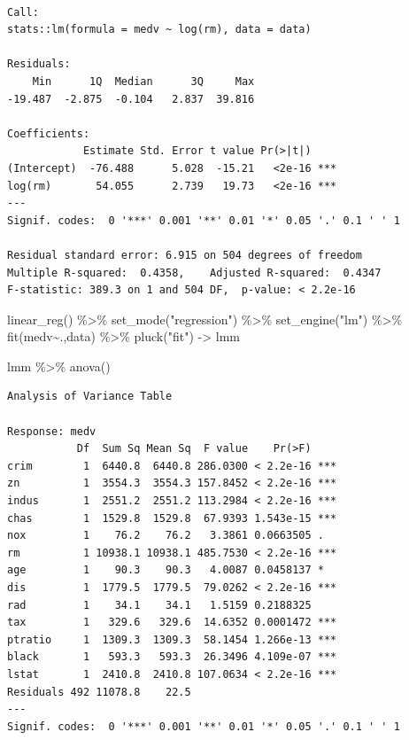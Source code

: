 \documentclass[
  letterpaper,
  DIV=11,
  numbers=noendperiod]{scrreprt}
\newenvironment{Shaded}{\begin{snugshade}}{\end{snugshade}}
\newcommand{\FunctionTok}[1]{\textcolor[rgb]{0.02,0.16,0.49}{#1}}
\newcommand{\NormalTok}[1]{\textcolor[rgb]{0.33,0.33,0.33}{#1}}
\newcommand{\OtherTok}[1]{\textcolor[rgb]{0.85,0.12,0.09}{#1}}
\newcommand{\SpecialCharTok}[1]{\textcolor[rgb]{0.00,0.46,0.62}{#1}}
\newcommand{\StringTok}[1]{\textcolor[rgb]{0.00,0.50,0.00}{#1}}
\begin{document}
\begin{verbatim}

Call:
stats::lm(formula = medv ~ log(rm), data = data)

Residuals:
    Min      1Q  Median      3Q     Max 
-19.487  -2.875  -0.104   2.837  39.816 

Coefficients:
            Estimate Std. Error t value Pr(>|t|)    
(Intercept)  -76.488      5.028  -15.21   <2e-16 ***
log(rm)       54.055      2.739   19.73   <2e-16 ***
---
Signif. codes:  0 '***' 0.001 '**' 0.01 '*' 0.05 '.' 0.1 ' ' 1

Residual standard error: 6.915 on 504 degrees of freedom
Multiple R-squared:  0.4358,    Adjusted R-squared:  0.4347 
F-statistic: 389.3 on 1 and 504 DF,  p-value: < 2.2e-16
\end{verbatim}

\begin{Shaded}
\begin{Highlighting}[]
\FunctionTok{linear\_reg}\NormalTok{() }\SpecialCharTok{\%\textgreater{}\%} 
  \FunctionTok{set\_mode}\NormalTok{(}\StringTok{"regression"}\NormalTok{) }\SpecialCharTok{\%\textgreater{}\%} 
  \FunctionTok{set\_engine}\NormalTok{(}\StringTok{"lm"}\NormalTok{) }\SpecialCharTok{\%\textgreater{}\%} 
  \FunctionTok{fit}\NormalTok{(medv}\SpecialCharTok{\textasciitilde{}}\NormalTok{.,data) }\SpecialCharTok{\%\textgreater{}\%} 
  \FunctionTok{pluck}\NormalTok{(}\StringTok{"fit"}\NormalTok{) }\OtherTok{{-}\textgreater{}}\NormalTok{ lmm}
\end{Highlighting}
\end{Shaded}

\begin{Shaded}
\begin{Highlighting}[]
\NormalTok{lmm }\SpecialCharTok{\%\textgreater{}\%} \FunctionTok{anova}\NormalTok{()}
\end{Highlighting}
\end{Shaded}

\begin{verbatim}
Analysis of Variance Table

Response: medv
           Df  Sum Sq Mean Sq  F value    Pr(>F)    
crim        1  6440.8  6440.8 286.0300 < 2.2e-16 ***
zn          1  3554.3  3554.3 157.8452 < 2.2e-16 ***
indus       1  2551.2  2551.2 113.2984 < 2.2e-16 ***
chas        1  1529.8  1529.8  67.9393 1.543e-15 ***
nox         1    76.2    76.2   3.3861 0.0663505 .  
rm          1 10938.1 10938.1 485.7530 < 2.2e-16 ***
age         1    90.3    90.3   4.0087 0.0458137 *  
dis         1  1779.5  1779.5  79.0262 < 2.2e-16 ***
rad         1    34.1    34.1   1.5159 0.2188325    
tax         1   329.6   329.6  14.6352 0.0001472 ***
ptratio     1  1309.3  1309.3  58.1454 1.266e-13 ***
black       1   593.3   593.3  26.3496 4.109e-07 ***
lstat       1  2410.8  2410.8 107.0634 < 2.2e-16 ***
Residuals 492 11078.8    22.5                       
---
Signif. codes:  0 '***' 0.001 '**' 0.01 '*' 0.05 '.' 0.1 ' ' 1
\end{verbatim}
\end{document}
